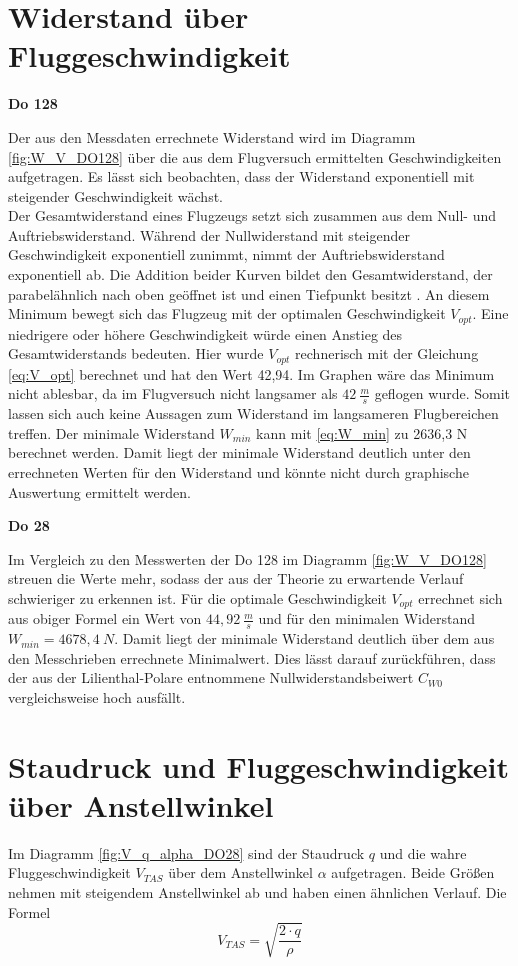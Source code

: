 \section{Widerstand über Fluggeschwindigkeit}

\textbf{Do 128}

Der aus den Messdaten errechnete Widerstand wird im Diagramm \ref{fig:W_V_DO128} über die aus dem Flugversuch ermittelten Geschwindigkeiten aufgetragen. Es lässt sich beobachten, dass der Widerstand exponentiell mit steigender Geschwindigkeit wächst. \\
Der Gesamtwiderstand eines Flugzeugs setzt sich zusammen aus dem Null- und Auftriebswiderstand. Während der Nullwiderstand mit steigender Geschwindigkeit exponentiell zunimmt, nimmt der Auftriebswiderstand exponentiell ab. Die Addition beider Kurven bildet den Gesamtwiderstand, der parabelähnlich nach oben geöffnet ist und einen Tiefpunkt besitzt \cite{Skript}. An diesem Minimum bewegt sich das Flugzeug mit der optimalen Geschwindigkeit $V_{opt}$. Eine niedrigere oder höhere Geschwindigkeit würde einen Anstieg des Gesamtwiderstands bedeuten. Hier wurde $V_{opt}$ rechnerisch mit der Gleichung \ref{eq:V_opt} berechnet und hat den Wert 42,94. Im Graphen wäre das Minimum nicht ablesbar, da im Flugversuch nicht langsamer als $42 \ \frac{m}{s}$ geflogen wurde. Somit lassen sich auch keine Aussagen zum Widerstand im langsameren Flugbereichen treffen. Der minimale Widerstand $W_{min}$ kann mit \ref{eq:W_min} zu 2636,3 N berechnet werden. Damit liegt der minimale Widerstand deutlich unter den errechneten Werten für den Widerstand und könnte nicht durch graphische Auswertung ermittelt werden.

\textbf{Do 28}

Im Vergleich zu den Messwerten der Do 128 im Diagramm \ref{fig:W_V_DO128} streuen die Werte mehr, sodass der aus der Theorie zu erwartende Verlauf schwieriger zu erkennen ist. Für die optimale Geschwindigkeit $V_{opt}$ errechnet sich aus obiger Formel ein Wert von $44,92 \ \frac{m}{s}$ und für den minimalen Widerstand $W_{min}=4678,4 \ N$. Damit liegt der minimale Widerstand deutlich über dem aus den Messchrieben errechnete Minimalwert. Dies lässt darauf zurückführen, dass der aus der Lilienthal-Polare entnommene Nullwiderstandsbeiwert $C_{W0}$ vergleichsweise hoch ausfällt. 


\section{Staudruck und Fluggeschwindigkeit über Anstellwinkel}
Im  Diagramm \ref{fig:V_q_alpha_DO28} sind der Staudruck $q$ und die wahre Fluggeschwindigkeit $V_{TAS}$ über dem Anstellwinkel $\alpha$ aufgetragen. Beide Größen nehmen mit steigendem Anstellwinkel ab und haben einen ähnlichen Verlauf. Die Formel \cite{Kurzskript}
\begin{equation}
V_{TAS}=\sqrt{\frac{2 \cdot q}{\rho}}
\end{equation}

